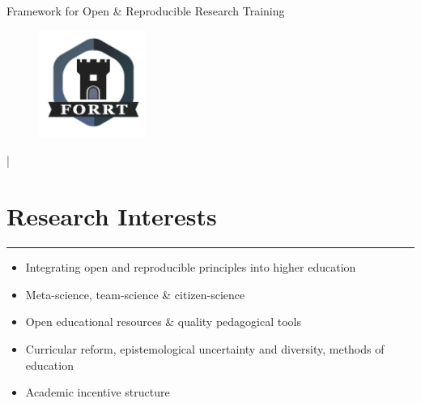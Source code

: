 \documentclass[letterpaper]{article}
\def\name{Framework for Open \& Reproducible Research Training}
\newcommand{\MYhref}[3][Gray]{\href{#2}{\color{#1}{#3}}}%
\begin{document}
\centerline{\selectfont\huge \name}


\begin{figure}
    \centering
    \includegraphics[width=3.5cm]{FORRT.png}
\end{figure}


\begin{center}
    \large \color{Gray}
\vspace{-0.5em}
\item
\hspace{-1.5em} \MYhref{mailto:info@forrt.org}{info@forrt.org} | \MYhref{https://forrt.org/}{forrt.org}
\end{center}









\section*{\color{Brown}Research Interests}
\vspace{-.5em}
\hrule
\vspace{1em}

\begin{itemize}
\item Integrating open and reproducible principles into higher education
\item Meta-science, team-science \& citizen-science
\item Open educational resources \& quality pedagogical tools
\item Curricular reform, epistemological uncertainty and diversity, methods of education
\item Academic incentive structure 
\end{itemize}




\\~\\
\end{document}
